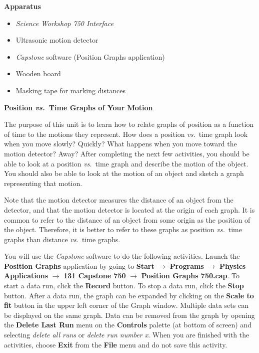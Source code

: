 \textbf{Apparatus} 

\begin{itemize}
\item \textit{Science Workshop 750 Interface}
\item Ultrasonic motion detector 
\item \textit{Capstone} software (Position Graphs application)
\item Wooden board
\item Masking tape for marking distances
\end{itemize}
\textbf{Position \textit{vs.}~Time Graphs of Your Motion }

The purpose of this unit is to learn how to relate graphs of position as a function
of time to the motions they represent. How does a position \textit{vs.}~time graph look
when you move slowly? Quickly? What happens when you move toward the motion
detector? Away? After completing the next few activities, you should be able
to look at a position \textit{vs.}~time graph and describe the motion of the object.
You should also be able to look at the motion of an object and sketch a graph
representing that motion.

Note that the motion detector measures the distance of an object from the detector,
and that the motion detector is located at the origin of each graph. It is common
to refer to the distance of an object from some origin as the position of the
object. Therefore, it is better to refer to these graphs as position \textit{vs.}~time
graphs than distance \textit{vs.}~time graphs.

You will use the \textit{Capstone} software to do the following activities.
Launch the \textbf{Position Graphs} application by going to \textbf{Start} $\rightarrow$ \textbf{Programs} $\rightarrow$ \textbf{Physics Applications} $\rightarrow$ \textbf{131 Capstone 750} $\rightarrow$ 
\textbf{Position Graphs 750.cap}. To start a data run, click the \textbf{Record} button. To stop a data run,
click the \textbf{Stop} button. After a data run, the graph can be expanded
by clicking on the \textbf{Scale to fit} button in the upper left corner of
the Graph window. Multiple data sets can be displayed on the same graph. Data
can be removed from the graph by opening the \textbf{Delete Last Run} menu on the \textbf{Controls} palette 
 (at bottom of screen) and selecting \textit{delete all runs} or \textit{delete run number x}.
  When you are finished with the activities, choose \textbf{Exit} from the \textbf{File} menu
and do not save this activity.

